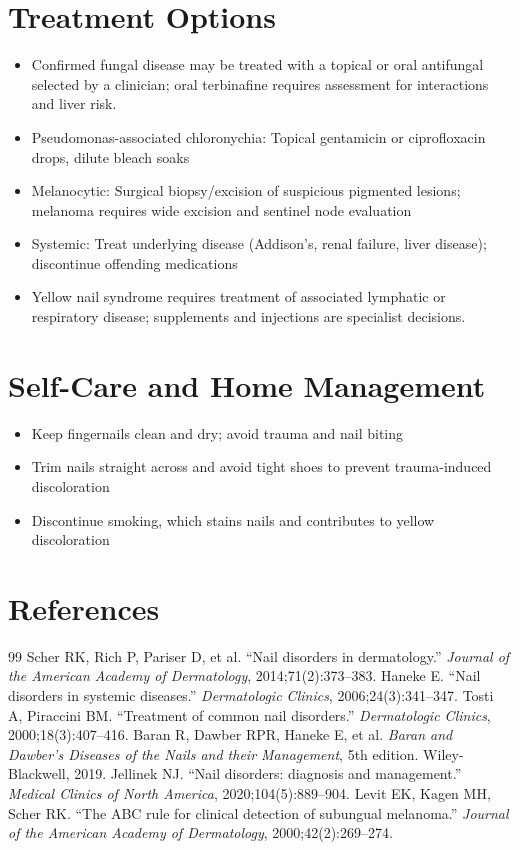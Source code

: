 \section*{Treatment Options}
\begin{itemize}
  \item Confirmed fungal disease may be treated with a topical or oral antifungal selected by a clinician; oral terbinafine requires assessment for interactions and liver risk.
  \item Pseudomonas-associated chloronychia: Topical gentamicin or ciprofloxacin drops, dilute bleach soaks
  \item Melanocytic: Surgical biopsy/excision of suspicious pigmented lesions; melanoma requires wide excision and sentinel node evaluation
  \item Systemic: Treat underlying disease (Addison's, renal failure, liver disease); discontinue offending medications
  \item Yellow nail syndrome requires treatment of associated lymphatic or respiratory disease; supplements and injections are specialist decisions.
\end{itemize}

\section*{Self-Care and Home Management}
\begin{itemize}
  \item Keep fingernails clean and dry; avoid trauma and nail biting
  \item Trim nails straight across and avoid tight shoes to prevent trauma-induced discoloration
  \item Discontinue smoking, which stains nails and contributes to yellow discoloration
\end{itemize}

\section*{References}
\begin{thebibliography}{99}
 Scher RK, Rich P, Pariser D, et al. ``Nail disorders in dermatology.'' \textit{Journal of the American Academy of Dermatology}, 2014;71(2):373--383.
 Haneke E. ``Nail disorders in systemic diseases.'' \textit{Dermatologic Clinics}, 2006;24(3):341--347.
 Tosti A, Piraccini BM. ``Treatment of common nail disorders.'' \textit{Dermatologic Clinics}, 2000;18(3):407--416.
 Baran R, Dawber RPR, Haneke E, et al. \textit{Baran and Dawber's Diseases of the Nails and their Management}, 5th edition. Wiley-Blackwell, 2019.
 Jellinek NJ. ``Nail disorders: diagnosis and management.'' \textit{Medical Clinics of North America}, 2020;104(5):889--904.
 Levit EK, Kagen MH, Scher RK. ``The ABC rule for clinical detection of subungual melanoma.'' \textit{Journal of the American Academy of Dermatology}, 2000;42(2):269--274.

\end{thebibliography}
